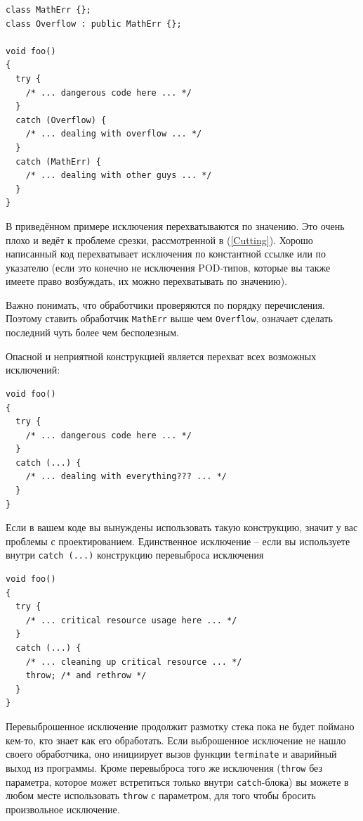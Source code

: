 \documentclass[a4paper,12pt,oneside]{article}
\begin{document}
\begin{lstlisting}
class MathErr {};
class Overflow : public MathErr {};

void foo()
{
  try {
    /* ... dangerous code here ... */
  }
  catch (Overflow) {
    /* ... dealing with overflow ... */
  }
  catch (MathErr) {
    /* ... dealing with other guys ... */
  }
}

\end{lstlisting}

В приведённом примере исключения перехватываются по значению. Это очень плохо и ведёт к проблеме срезки, рассмотренной в (\ref{Cutting}). Хорошо написанный код перехватывает исключения по константной ссылке или по указателю (если это конечно не исключения POD-типов, которые вы также имеете право возбуждать, их можно перехватывать по значению).

Важно понимать, что обработчики проверяются по порядку перечисления. Поэтому ставить обработчик \lstinline!MathErr! выше чем \lstinline!Overflow!, означает сделать последний чуть более чем бесполезным.

Опасной и неприятной конструкцией является перехват всех возможных исключений:

\begin{lstlisting}
void foo()
{
  try {
    /* ... dangerous code here ... */
  }
  catch (...) {
    /* ... dealing with everything??? ... */
  }
}
\end{lstlisting}

Если в вашем коде вы вынуждены использовать такую конструкцию, значит у вас проблемы с проектированием. Единственное исключение -- если вы используете внутри \lstinline!catch (...)! конструкцию перевыброса исключения

\begin{lstlisting}
void foo()
{
  try {
    /* ... critical resource usage here ... */
  }
  catch (...) {
    /* ... cleaning up critical resource ... */
    throw; /* and rethrow */
  }
}
\end{lstlisting}

Перевыброшенное исключение продолжит размотку стека пока не будет поймано кем-то, кто знает как его обработать. Если выброшенное исключение не нашло своего обработчика, оно инициирует вызов функции \lstinline!terminate! и аварийный выход из программы. Кроме перевыброса того же исключения (\lstinline!throw! без параметра, которое может встретиться только внутри \lstinline!catch!-блока) вы можете в любом месте использовать \lstinline!throw! с параметром, для того чтобы бросить произвольное исключение. 
\end{document}
